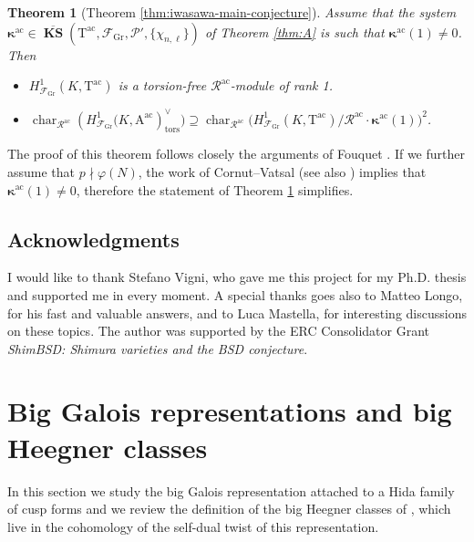 \documentclass[12pt,reqno]{amsart}
\newtheorem{theoremx}{Theorem}
\theoremstyle{definition}
\theoremstyle{remark}
\newcommand{\T}{\boldsymbol{\mathrm{T}}}
\newcommand{\calR}{\mathcal{R}}
\newcommand{\A}{\boldsymbol{\mathrm{A}}}
\DeclareMathOperator{\Char}{char}
\DeclareMathOperator{\ks}{KS}
\newcommand{\KS}{\boldsymbol{\ks}}
\newcommand{\ac}{\mathrm{ac}}
\newcommand{\Gr}{\mathrm{Gr}}
\newcommand{\tors}{\mathrm{tors}}
\newcommand{\gk}{\kappa}
\begin{document}
\begin{theoremx}[Theorem \ref{thm:iwasawa-main-conjecture}]\label{thm:B}
    Assume that the system $\boldsymbol{\gk}^\ac\in \overline{\KS}(\T^\ac,\mathcal{F}_\Gr,\mathcal{P}',\{\chi_{n,\ell}\})$ of Theorem \ref{thm:A} is such that $\boldsymbol{\gk}^{\ac}(1)\ne 0$. Then  
    \begin{itemize}
        \item[(a)] $H^1_{\mathcal{F}_\Gr}(K,\T^\ac)$ is a torsion-free  $\calR^\ac$-module of rank 1.
        \item[(b)] $\Char_{\calR^\ac}(H^1_{\mathcal{F}_\Gr}\big(K,\A^\ac)^\vee_{\tors}\big)\supseteq \Char_{\calR^\ac}\big(H^1_{\mathcal{F}_\Gr}(K,\T^{\ac})/\calR^\ac\cdot \boldsymbol{\gk}^\ac(1)\big)^2$.
    \end{itemize}
\end{theoremx}

The proof of this theorem follows closely the arguments of Fouquet \cite[§5-6]{Fouquet13:Dihedral}. If we further assume that $p\nmid\varphi(N)$, the work of Cornut--Vatsal \cite{cornut-vatsal2007:nontriviality} (see also \cite[Corollary 3.1.2]{Howard07:variation-of-Heegner-points-in-Hida-families}) implies that $\boldsymbol{\gk}^\ac(1)\ne 0$, therefore the statement of Theorem \ref{thm:B} simplifies. 

\subsection{Acknowledgments}
I would like to thank Stefano Vigni, who gave me this project for my Ph.D. thesis and supported me in every moment. A special thanks goes also to Matteo Longo, for his fast and valuable answers, and to Luca Mastella, for interesting discussions on these topics. The author was supported by the ERC Consolidator Grant \emph{ShimBSD: Shimura varieties and the BSD conjecture}.



\section{Big Galois representations and big Heegner classes}

In this section we study the big Galois representation attached to a Hida family of cusp forms and we review the definition of the big Heegner classes of \cite{Longo-Vigni11:quaternion-algebras-Hida-families}, which live in the cohomology of the self-dual twist of this representation.
\end{document}
